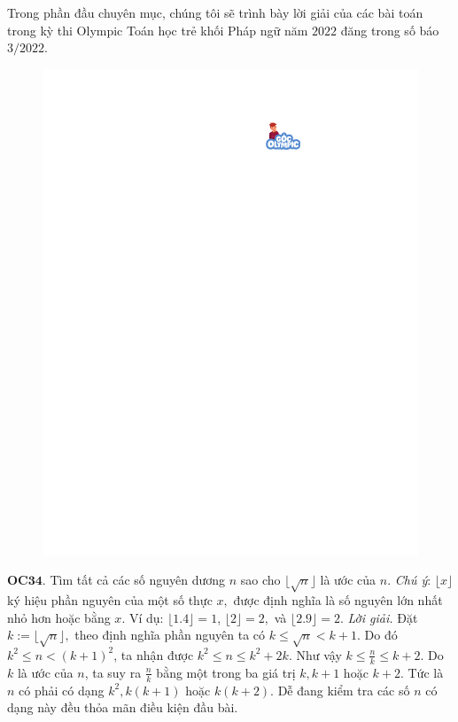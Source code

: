 \begin{multicols}{2}
	Trong phần đầu chuyên mục, chúng tôi sẽ trình bày lời giải của các bài toán trong kỳ thi Olympic Toán học trẻ khối Pháp ngữ năm $2022$ đăng trong số báo $3/2022$. 
	\begin{figure}[H]
		\vspace*{-5pt}
		\centering
		\captionsetup{labelformat= empty, justification=centering}
		\includegraphics[width= 1\linewidth]{gocolympic}
		\vspace*{-15pt}
	\end{figure}
	{\bf\color{cackithi} OC$\pmb{34.}$} Tìm tất cả các số nguyên dương $n$ sao cho $ \lfloor \sqrt{n}\rfloor $ là ước của $n.$ 
	\vskip 0.1cm
	\textit{Chú ý}: $ \lfloor x \rfloor $ ký hiệu phần nguyên của một số thực $x,$ được định nghĩa là số nguyên lớn nhất nhỏ hơn hoặc bằng $x.$ Ví dụ: $ \lfloor 1.4 \rfloor =1$, $ \lfloor 2 \rfloor=2,$ và  $ \lfloor 2.9 \rfloor= 2.$  
	\vskip 0.1cm 
	\textit{Lời giải.} Đặt $k:=\lfloor \sqrt{n}\rfloor,$ theo định nghĩa phần nguyên ta có $k\le \sqrt{n}< k+1.$ Do đó $k^2\le n < (k+1)^2$, ta nhận được $k^2\le n\le k^2+2k$. Như vậy $k\le \frac{n}{k}\le k+2.$ Do $k$ là ước của $n$, ta suy ra $\frac{n}{k}$  bằng  một trong ba giá trị $k, k+1$ hoặc $k+2$. Tức là $n$ có phải có dạng $k^2, k(k+1)$ hoặc $k(k+2)$. Dễ đang kiểm tra các số $n$ có dạng này đều thỏa mãn điều kiện đầu bài.  

\end{multicols}
